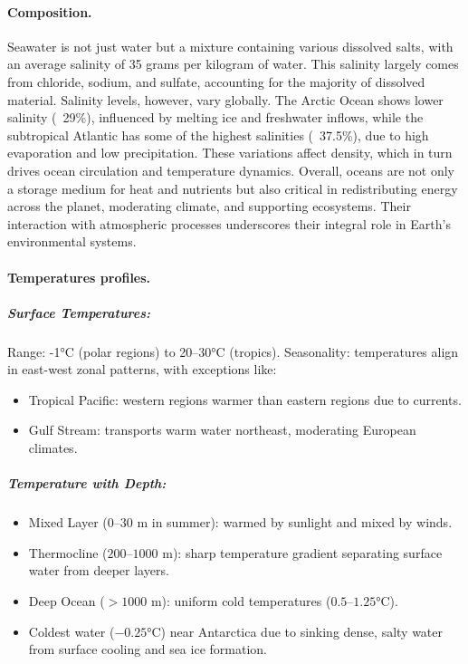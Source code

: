\paragraph{Composition.} Seawater is not just water but a mixture containing various dissolved salts, with an average salinity of 35 grams per kilogram of water. This salinity largely comes from chloride, sodium, and sulfate, accounting for the majority of dissolved material. Salinity levels, however, vary globally. The Arctic Ocean shows lower salinity (~29\%), influenced by melting ice and freshwater inflows, while the subtropical Atlantic has some of the highest salinities (~37.5\%), due to high evaporation and low precipitation. These variations affect density, which in turn drives ocean circulation and temperature dynamics.
Overall, oceans are not only a storage medium for heat and nutrients but also critical in redistributing energy across the planet, moderating climate, and supporting ecosystems. Their interaction with atmospheric processes underscores their integral role in Earth's environmental systems.
\paragraph{Temperatures profiles.}
\subparagraph{Surface Temperatures:}
Range: -1°C (polar regions) to 20–30°C (tropics).
Seasonality: temperatures align in east-west zonal patterns, with exceptions like:
\begin{itemize}
	\item Tropical Pacific: western regions warmer than eastern regions due to currents.
	\item Gulf Stream: transports warm water northeast, moderating European climates.
\end{itemize}

\subparagraph{Temperature with Depth:}
\begin{itemize}
	\item Mixed Layer ($0–30$ m in summer):
	      warmed by sunlight and mixed by winds.
	\item Thermocline ($200–1000$ m):
	      sharp temperature gradient separating surface water from deeper layers.
	\item Deep Ocean ($>1000$ m):
	      uniform cold temperatures ($0.5–1.25°$C).
	\item Coldest water ($-0.25°$C) near Antarctica due to sinking dense, salty water from surface cooling and sea ice formation.
\end{itemize}


